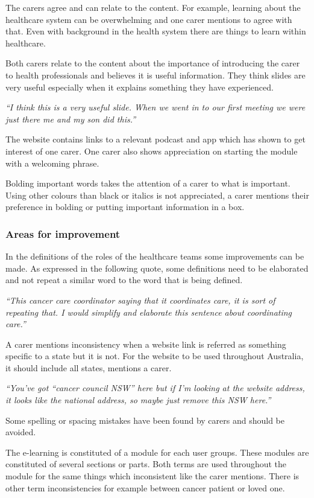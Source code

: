 \documentclass{sigchi}
\begin{document}
The carers agree and can relate to the content. For example, learning about the healthcare system can be overwhelming and one carer mentions to agree with that. Even with background in the health system there are things to learn within healthcare.

Both carers relate to the content about the importance of introducing the carer to health professionals and believes it is useful information. They think slides are very useful especially when it explains something they have experienced.

\textit{“I think this is a very useful slide. When we went in to our first meeting we were just there me and my son did this.”}

The website contains links to a relevant podcast and app which has shown to get interest of one carer. One carer also shows appreciation on starting the module with a welcoming phrase.

Bolding important words takes the attention of a carer to what is important. Using other colours than black or italics is not appreciated, a carer mentions their preference in bolding or putting important information in a box.

\subsubsection{Areas for improvement}
In the definitions of the roles of the healthcare teams some improvements can be made. As expressed in the following quote, some definitions need to be elaborated and not repeat a similar word to the word that is being defined.

\textit{“This cancer care coordinator saying that it coordinates care, it is sort of repeating that. I would simplify and elaborate this sentence about coordinating care.”}

A carer mentions inconsistency when a website link is referred as something specific to a state but it is not. For the website to be used throughout Australia, it should include all states, mentions a carer. 

\textit{“You’ve got “cancer council NSW” here but if I’m looking at the website address, it looks like the national address, so maybe just remove this NSW here.”}

Some spelling or spacing mistakes have been found by carers and should be avoided.

The e-learning is constituted of a module for each user groups. These modules are constituted of several sections or parts. Both terms are used throughout the module for the same things which inconsistent like the carer mentions. There is other term inconsistencies for example between cancer patient or loved one.
\end{document}
